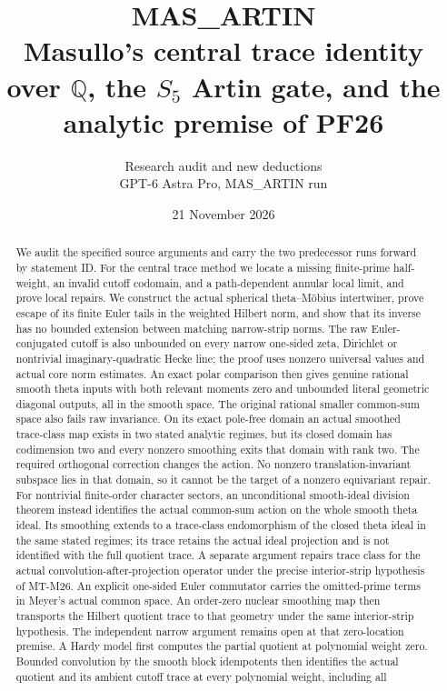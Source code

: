 \documentclass[11pt,a4paper]{article}
\title{MAS\_ARTIN\\[5pt]\large Masullo's central trace identity over
$\mathbb Q$, the $S_5$ Artin gate, and the analytic premise of PF26}
\author{Research audit and new deductions\\GPT-6 Astra Pro, MAS\_ARTIN run}
\date{21 November 2026\\\small\RunStatus}
\begin{document}
\maketitle
\begin{abstract}
We audit the specified source arguments and carry the two predecessor
runs forward by statement ID. For the central trace method we locate
a missing finite-prime half-weight, an invalid cutoff codomain, and
a path-dependent annular local limit, and prove local repairs. We
construct the actual spherical theta--M\"obius intertwiner, prove
escape of its finite Euler tails in the weighted Hilbert norm, and
show that its inverse has no bounded extension between matching
narrow-strip norms. The raw Euler-conjugated cutoff is also unbounded on every
narrow one-sided zeta, Dirichlet or nontrivial imaginary-quadratic
Hecke line; the proof uses
nonzero universal values and actual core norm estimates.
An exact polar comparison then gives genuine rational smooth
theta inputs with both relevant moments zero and unbounded
literal geometric diagonal outputs, all in the smooth space.
The original rational smaller common-sum space also fails
raw invariance. On its exact pole-free domain an actual
smoothed trace-class map exists in two stated analytic regimes,
but its closed domain has codimension two and every nonzero
smoothing exits that domain with rank two. The required
orthogonal correction changes the action. No nonzero
translation-invariant subspace lies in that domain, so it
cannot be the target of a nonzero equivariant repair.
For nontrivial finite-order character sectors, an unconditional
smooth-ideal division theorem instead identifies the actual
common-sum action on the whole smooth theta ideal. Its smoothing
extends to a trace-class endomorphism of the closed theta ideal
in the same stated regimes; its trace retains the actual ideal
projection and is not identified with the full quotient trace.
A separate argument repairs trace class for
the actual convolution-after-projection operator under the precise
interior-strip hypothesis of MT-M26. An explicit one-sided Euler
commutator carries the omitted-prime terms in Meyer's actual common
space. An order-zero nuclear smoothing map then transports the
Hilbert quotient trace to that geometry under the same interior-strip
hypothesis. The independent narrow argument remains open at that
zero-location premise. A Hardy model first computes the partial
quotient at polynomial weight zero. Bounded convolution by the
smooth block idempotents then identifies the actual quotient and
its ambient cutoff trace at every polynomial weight, including all

\end{abstract}
\end{document}
